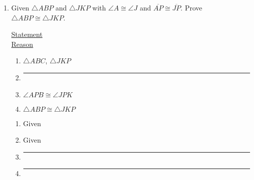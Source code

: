 \begin{enumerate}
\newpage
\item Given $\triangle ABP$ and $\triangle JKP$ with $\angle A \cong \angle J$ and $\overline{AP} \cong \overline{JP}$. Prove $\triangle ABP \cong \triangle JKP$.\\[0.5cm]
  \begin{multicols}{2}
    \underline{Statement} \\
    \underline{Reason}
  \end{multicols}
  \begin{multicols}{2}
    \raggedcolumns
    \begin{enumerate}[label={\arabic*)}]
      \item $\triangle ABC$, $\triangle JKP$
      \item \rule{4cm}{0.15mm}%
      \item $\angle APB \cong \angle JPK$ 
      \item $\triangle ABP \cong \triangle JKP$
    \end{enumerate}
    \begin{enumerate}[label={\arabic*)}]
      \item Given
      \item Given
      \item \rule{4cm}{0.15mm}
      \item \rule{4cm}{0.15mm}
    \end{enumerate}
  \end{multicols}


\end{enumerate}

